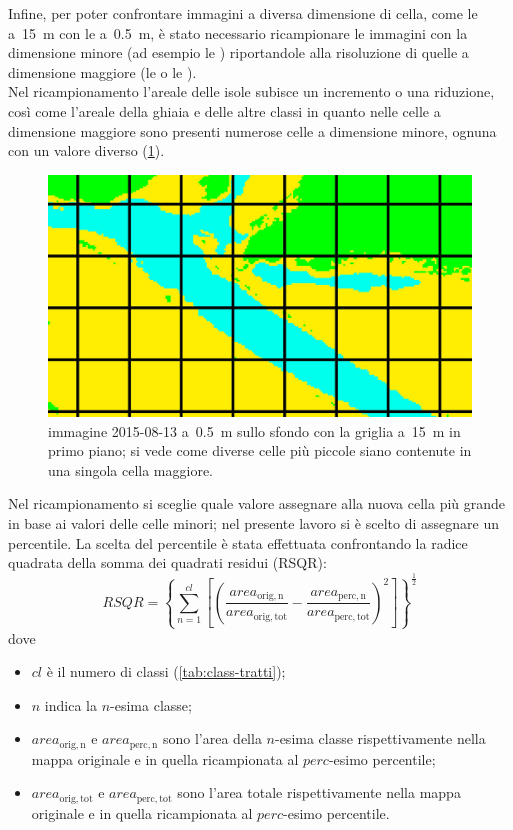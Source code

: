 Infine, per poter confrontare immagini a diversa dimensione di cella, come le \AST{} a~\SI{15}{\m} con le \Pl{} a~\SI{0.5}{\m}, è stato necessario ricampionare le immagini con la dimensione minore (ad esempio le \Pl{}) riportandole alla risoluzione di quelle a dimensione maggiore (le \AST{} o le \Se{}).
\\
Nel ricampionamento l'areale delle isole subisce un incremento o una riduzione, così come l'areale della ghiaia e delle altre classi in quanto nelle celle a dimensione maggiore sono presenti numerose celle a dimensione minore, ognuna con un valore diverso (\cref{fig:ricamp-explanation}).
%
\begin{figure}
	\centering
	\includegraphics[width=.9\textwidth]{files/ricamp_griglia.jpeg}
	\caption[celle a risoluzione diversa]{immagine \Pl{} 2015-08-13 a~\SI{0.5}{\m} sullo sfondo con la griglia a~\SI{15}{\m} in primo piano; si vede come diverse celle più piccole siano contenute in una singola cella maggiore.}
	\label{fig:ricamp-explanation}
\end{figure}
%
Nel ricampionamento si sceglie quale valore assegnare alla nuova cella più grande in base ai valori delle celle minori; nel presente lavoro si è scelto di assegnare un percentile.
La scelta del percentile è stata effettuata confrontando la radice quadrata della somma dei quadrati residui (RSQR):
%
\begin{equation}
	\label{eq:rad-som-quad-res}
	RSQR = \left\lbrace \sum_{n=1}^{cl} \left[\left( \frac{area_{\mathrm{orig,n}}}{area_{\mathrm{orig,tot}}} - \frac{area_{\mathrm{perc,n}}}{area_{\mathrm{perc,tot}}} \right)^2 \right] \right\rbrace ^ \frac{1}{2}	
\end{equation}
%
dove 
\begin{itemize}
	\item $cl$ è il numero di classi (\cref{tab:class-tratti});
	\item $n$ indica la $n$-esima classe;
	\item $area_{\mathrm{orig,n}}$ e $area_{\mathrm{perc,n}}$ sono l'area della $n$-esima classe rispettivamente nella mappa originale e in quella ricampionata al $perc$-esimo percentile;
	\item $area_{\mathrm{orig,tot}}$ e $area_{\mathrm{perc,tot}}$ sono l'area totale rispettivamente nella mappa originale e in quella ricampionata al $perc$-esimo percentile. 
\end{itemize} 
